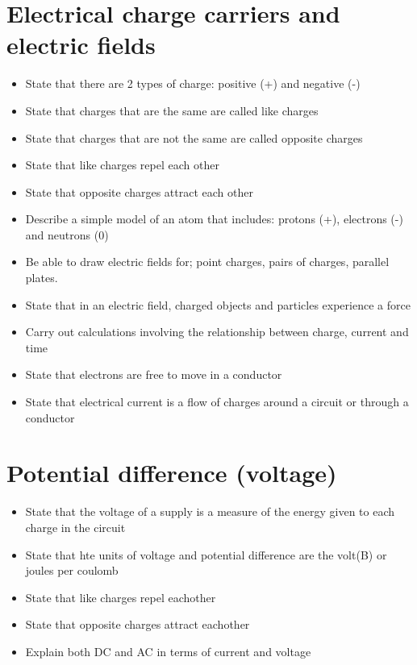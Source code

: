 \section{Electrical charge carriers and electric fields}

\begin{multicols}{2}
	\begin{itemize}
		\item State that there are 2 types of charge: positive (+) and negative (-)
		\item State that charges that are the same are called like charges
		\item State that charges that are not the same are called opposite charges
		\item State that like charges repel each other
		\item State that opposite charges attract each other
		\item Describe a simple model of an atom that includes: protons (+), electrons (-) and neutrons (0)
		\item Be able to draw electric fields for; point charges, pairs of charges, parallel plates.
		\item State that in an electric field, charged objects and particles experience a force
		\item Carry out calculations involving the relationship between charge, current and time
		\item State that electrons are free to move in a conductor
		\item State that electrical current is a flow of charges around a circuit or through a conductor
	\end{itemize}
\end{multicols}

\section{Potential difference (voltage)}
\begin{multicols}{2}
	\begin{itemize}
		\item State that the voltage of a supply is a measure of the energy given to each charge in the circuit
		\item State that hte units of voltage and potential difference are the volt(B) or joules per coulomb
		\item State that like charges repel eachother
		\item State that opposite charges attract eachother
		\item Explain both DC and AC in terms of current and voltage
	\end{itemize}
\end{multicols}

